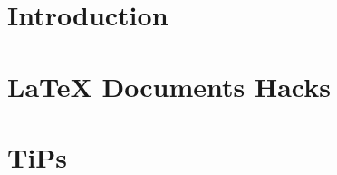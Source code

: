 \documentclass[british, twoside]{ntnuthesis}  %
\begin{document}
    

    
    \chapter{Introduction}
        
    
    \chapter{LaTeX Documents Hacks}
        
    
    \chapter{TiPs}\label{chap:tiling}
        

    \printbibliography

    \ifPRINTING
    \newpage
    \thispagestyle{empty}
    \vspace*{\fill}
    \clearpage
    \fi
\end{document}
